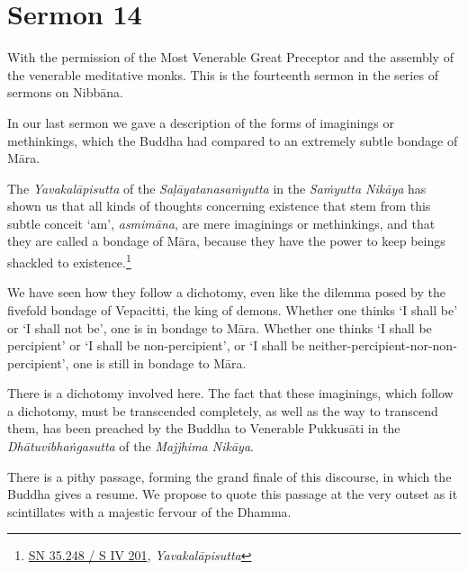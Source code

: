 \chapter{Sermon 14}

\NibbanaOpeningQuote

With the permission of the Most Venerable Great Preceptor and the assembly of the venerable meditative monks. This is the fourteenth sermon in the series of sermons on Nibbāna.

In our last sermon we gave a description of the forms of imaginings or methinkings, which the Buddha had compared to an extremely subtle bondage of Māra.

The \emph{Yavakalāpisutta} of the \emph{Saḷāyatanasaṁyutta} in the \emph{Saṁyutta Nikāya} has shown us that all kinds of thoughts concerning existence that stem from this subtle conceit `am', \emph{asmimāna}, are mere imaginings or methinkings, and that they are called a bondage of Māra, because they have the power to keep beings shackled to existence.\footnote{\href{https://suttacentral.net/sn35.248/pli/ms}{SN 35.248 / S IV 201}, \emph{Yavakalāpisutta}}

We have seen how they follow a dichotomy, even like the dilemma posed by the fivefold bondage of Vepacitti, the king of demons. Whether one thinks `I shall be' or `I shall not be', one is in bondage to Māra. Whether one thinks `I shall be percipient' or `I shall be non-percipient', or `I shall be neither-percipient-nor-non-percipient', one is still in bondage to Māra.

There is a dichotomy involved here. The fact that these imaginings, which follow a dichotomy, must be transcended completely, as well as the way to transcend them, has been preached by the Buddha to Venerable Pukkusāti in the \emph{Dhātuvibhaṅgasutta} of the \emph{Majjhima Nikāya}.

There is a pithy passage, forming the grand finale of this discourse, in which the Buddha gives a resume. We propose to quote this passage at the very outset as it scintillates with a majestic fervour of the Dhamma.

